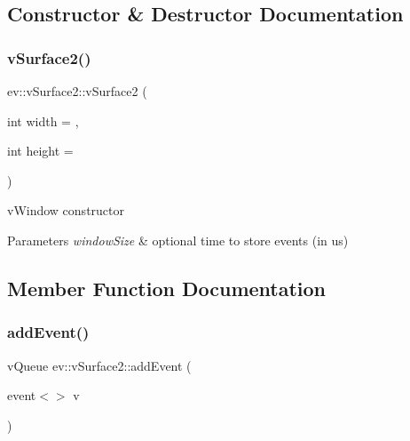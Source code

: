 \subsection{Constructor \& Destructor Documentation}
\mbox{\label{classev_1_1vSurface2_ada6aeb852479aa111b1f5ad32ac1286b}} 
\subsubsection{\texorpdfstring{v\+Surface2()}{vSurface2()}}
{\footnotesize\ttfamily ev\+::v\+Surface2\+::v\+Surface2 (\begin{DoxyParamCaption}\item[{int}]{width = {},  }\item[{int}]{height = {} }\end{DoxyParamCaption})}



v\+Window constructor 


\begin{DoxyParams}{Parameters}
{\em window\+Size} & optional time to store events (in us) \\
\hline
\end{DoxyParams}


\subsection{Member Function Documentation}
\mbox{\label{classev_1_1vSurface2_a6dee662976048b73d7b19e45871352da}} 
\subsubsection{\texorpdfstring{add\+Event()}{addEvent()}}
{\footnotesize\ttfamily v\+Queue ev\+::v\+Surface2\+::add\+Event (\begin{DoxyParamCaption}\item[{event$<$$>$}]{v }\end{DoxyParamCaption})\hspace{0.3cm}{\ttfamily [virtual]}}



